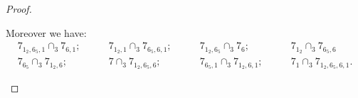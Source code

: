\documentclass{amsart}
\theoremstyle{definition}
\theoremstyle{remark}
\begin{document}
\begin{proof}
\begin{itemize}
    Moreover we have:
    \begin{align*}
           7_{1_2,6_5,1} \cap_3 7_{6,1}; \quad \quad
            & 7_{1_2,1} \cap_3 7_{6_5,6,1}; \quad \quad
            & 7_{1_2,6_5} \cap_3 7_{6}; \quad \quad
            & 7_{1_2} \cap_3 7_{6_5,6} \\
            7_{6_5} \cap_3 7_{1_2,6}; \quad \quad
            & 7 \cap_3 7_{1_2,6_5,6}; \quad \quad
            & 7_{6_5,1} \cap_3 7_{1_2,6,1}; \quad \quad
            & 7_{1} \cap_3 7_{1_2,6_5,6,1}.
    \end{align*}

    

\end{itemize}
\end{proof}
\end{document}
